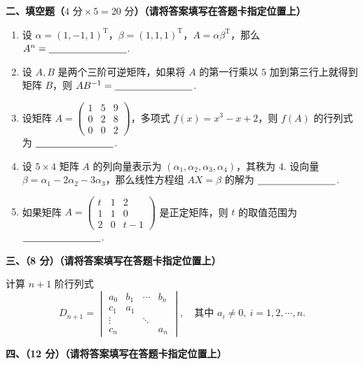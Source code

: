 \documentclass[a4paper,11pt]{ctexart}
\newcommand{\T}{\mathrm{T}}
\newcommand{\blank}[1][2.8cm]{\underline{\hspace{#1}}}
\begin{document}
\vspace{0.9em}

\textbf{二、填空题（$4\text{ 分}\times 5 = 20\text{ 分}$）（请将答案填写在答题卡指定位置上）}

\begin{enumerate}[label=\arabic*., leftmargin=2em, itemsep=1.0em, topsep=0.5em]
  \item 设 $\alpha = (1, -1, 1)^{\T}$，$\beta = (1, 1, 1)^{\T}$，$A = \alpha \beta^{\T}$，那么 $A^n = \blank$.

  \item 设 $A, B$ 是两个三阶可逆矩阵，如果将 $A$ 的第一行乘以 $5$ 加到第三行上就得到矩阵 $B$，则 $AB^{-1} = \blank$.

  \item 设矩阵 $A = \begin{pmatrix} 1 & 5 & 9 \\ 0 & 2 & 8 \\ 0 & 0 & 2 \end{pmatrix}$，多项式 $f(x) = x^3 - x + 2$，则 $f(A)$ 的行列式为 $\blank$.

  \item 设 $5 \times 4$ 矩阵 $A$ 的列向量表示为 $(\alpha_1, \alpha_2, \alpha_3, \alpha_4)$，其秩为 $4$. 设向量 $\beta = \alpha_1 - 2\alpha_2 - 3\alpha_3$，那么线性方程组 $AX = \beta$ 的解为 $\blank$.

  \item 如果矩阵 $A = \begin{pmatrix} t & 1 & 2 \\ 1 & 1 & 0 \\ 2 & 0 & t - 1 \end{pmatrix}$ 是正定矩阵，则 $t$ 的取值范围为 $\blank$.
\end{enumerate}

\vspace{0.9em}

\textbf{三、（8 分）（请将答案填写在答题卡指定位置上）}

计算 $n+1$ 阶行列式
\[
  D_{n+1} = \begin{vmatrix}
    a_0 & b_1 & \cdots & b_n \\
    c_1 & a_1 & & \\
    \vdots & & \ddots & \\
    c_n & & & a_n
  \end{vmatrix},
  \quad\text{其中 } a_i \neq 0,\ i = 1, 2, \cdots, n.
\]

\vspace{0.7em}

\textbf{四、（12 分）（请将答案填写在答题卡指定位置上）}
\end{document}
